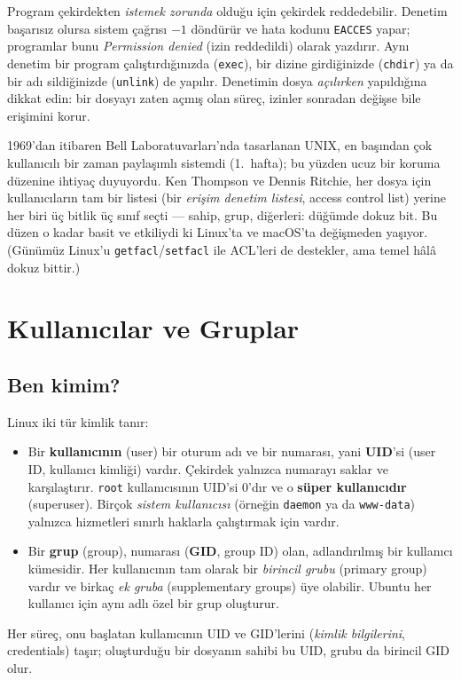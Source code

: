 \documentclass[11pt,a4paper]{article}
\newcommand{\term}[1]{\textbf{\color{mintdeep}#1}}
\newcommand{\cmd}[1]{\texttt{#1}}
\begin{document}
Program çekirdekten \emph{istemek zorunda} olduğu için çekirdek reddedebilir. Denetim başarısız olursa sistem çağrısı $-1$ döndürür ve hata kodunu \texttt{EACCES} yapar; programlar bunu \emph{Permission denied} (izin reddedildi) olarak yazdırır. Aynı denetim bir program çalıştırdığınızda (\cmd{exec}), bir dizine girdiğinizde (\cmd{chdir}) ya da bir adı sildiğinizde (\cmd{unlink}) de yapılır. Denetimin dosya \emph{açılırken} yapıldığına dikkat edin: bir dosyayı zaten açmış olan süreç, izinler sonradan değişse bile erişimini korur.


\begin{histnote}
1969'dan itibaren Bell Laboratuvarları'nda tasarlanan UNIX, en başından çok kullanıcılı bir zaman paylaşımlı sistemdi (1.~hafta); bu yüzden ucuz bir koruma düzenine ihtiyaç duyuyordu. Ken Thompson ve Dennis Ritchie, her dosya için kullanıcıların tam bir listesi (bir \emph{erişim denetim listesi}, access control list) yerine her biri üç bitlik üç sınıf seçti --- sahip, grup, diğerleri: düğümde dokuz bit. Bu düzen o kadar basit ve etkiliydi ki Linux'ta ve macOS'ta değişmeden yaşıyor. (Günümüz Linux'u \cmd{getfacl}/\cmd{setfacl} ile ACL'leri de destekler, ama temel hâlâ dokuz bittir.)
\end{histnote}

\section{Kullanıcılar ve Gruplar}

\subsection{Ben kimim?}
\label{sec:who}

Linux iki tür kimlik tanır:
\begin{itemize}
  \item Bir \term{kullanıcının} (user) bir oturum adı ve bir numarası, yani \term{UID}'si (user ID, kullanıcı kimliği) vardır. Çekirdek yalnızca numarayı saklar ve karşılaştırır. \texttt{root} kullanıcısının UID'si $0$'dır ve o \term{süper kullanıcıdır} (superuser). Birçok \emph{sistem kullanıcısı} (örneğin \texttt{daemon} ya da \texttt{www-data}) yalnızca hizmetleri sınırlı haklarla çalıştırmak için vardır.
  \item Bir \term{grup} (group), numarası (\term{GID}, group ID) olan, adlandırılmış bir kullanıcı kümesidir. Her kullanıcının tam olarak bir \emph{birincil grubu} (primary group) vardır ve birkaç \emph{ek gruba} (supplementary groups) üye olabilir. Ubuntu her kullanıcı için aynı adlı özel bir grup oluşturur.
\end{itemize}
Her süreç, onu başlatan kullanıcının UID ve GID'lerini (\emph{kimlik bilgilerini}, credentials) taşır; oluşturduğu bir dosyanın sahibi bu UID, grubu da birincil GID olur.
\end{document}
